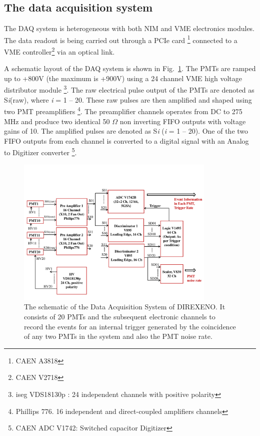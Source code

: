 \subsection{The data acquisition system }
\label{sec:DAQ}


The DAQ system is heterogeneous with both 
NIM and VME electronics modules. The data readout is being carried out through a PCIe card \footnote{CAEN A3818}  connected to a VME controller\footnote{CAEN V2718} via an optical link. 

A schematic layout of the DAQ system is shown in Fig.~{\ref{Fig:DAQscheme}}. 
The PMTs are ramped up to +800V (the maximum is +900V) using a 24 channel VME high voltage distributor module \footnote{iseg VDS18130p : 24 independent channels with positive polarity}. 
The raw electrical pulse output of the PMTs are denoted as S{\it i}(raw), where {\it i} = 1 -- 20. 
These raw pulses are then amplified and shaped using two PMT preamplifiers 
\footnote{Phillips 776. 16 independent and direct-coupled amplifiers channels}. 
The preamplifier channels operates from DC to 275 MHz and produce two identical 
50 $\Omega$ non inverting FIFO outputs with voltage gains of 10. 
The amplified pulses are denoted as S{\it i} 
({\it i} = 1 -- 20). One of the two FIFO outputs from each channel is converted to a 
digital signal with an Analog to Digitizer converter \footnote{CAEN ADC V1742: Switched capacitor Digitizer}. 

\begin{figure}[h]
   \centering
   \includegraphics[width=0.85\textwidth]{DAQscheme.pdf}
   \caption{The schematic of the Data Acquisition System of DIREXENO. It 
        consists of 20 PMTs and the subsequent electronic channels to record 
        the events for an internal trigger generated by the coincidence of any 
        two PMTs in the system and also the PMT noise rate.}
   \label{Fig:DAQscheme}
\end{figure}

